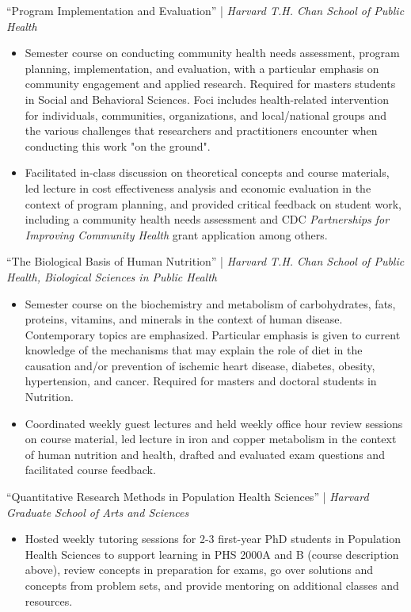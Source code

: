 \documentclass{cv_style}
\begin{document}
``Program Implementation and Evaluation'' | \textit{Harvard T.H. Chan School of Public Health}
\begin{itemize}
  \vspace{0em} \item Semester course on conducting community health needs assessment, program planning, implementation, and evaluation, with a particular emphasis on community engagement and applied research. Required for masters students in Social and Behavioral Sciences. Foci includes health-related intervention for individuals, communities, organizations, and local/national groups and the various challenges that researchers and practitioners encounter when conducting this work "on the ground". 
  \item \parskip 1pt Facilitated in-class discussion on theoretical concepts and course materials, led lecture in cost effectiveness analysis and economic evaluation in the context of program planning, and provided critical feedback on student work, including a community health needs assessment and CDC \textit{Partnerships for Improving Community Health} grant application among others. 
\end{itemize}

``The Biological Basis of Human Nutrition'' | \textit{Harvard T.H. Chan School of Public Health, Biological Sciences in Public Health}
\begin{itemize}
  \vspace{0em} \item Semester course on the biochemistry and metabolism of carbohydrates, fats, proteins, vitamins, and minerals in the context of human disease. Contemporary topics are emphasized. Particular emphasis is given to current knowledge of the mechanisms that may explain the role of diet in the causation and/or prevention of ischemic heart disease, diabetes, obesity, hypertension, and cancer. Required for masters and doctoral students in Nutrition.
  \item \parskip 1pt Coordinated weekly guest lectures and held weekly office hour review sessions on course material, led lecture in iron and copper metabolism in the context of human nutrition and health, drafted and evaluated exam questions and facilitated course feedback.
\end{itemize}

``Quantitative Research Methods in Population Health Sciences'' | \textit{Harvard Graduate School of Arts and Sciences}
\begin{itemize}
  \vspace{0em} \item Hosted weekly tutoring sessions for 2-3 first-year PhD students in Population Health Sciences to support learning in PHS 2000A and B (course description above), review concepts in preparation for exams, go over solutions and concepts from problem sets, and provide mentoring on additional classes and resources.
\end{itemize}
\end{document}
